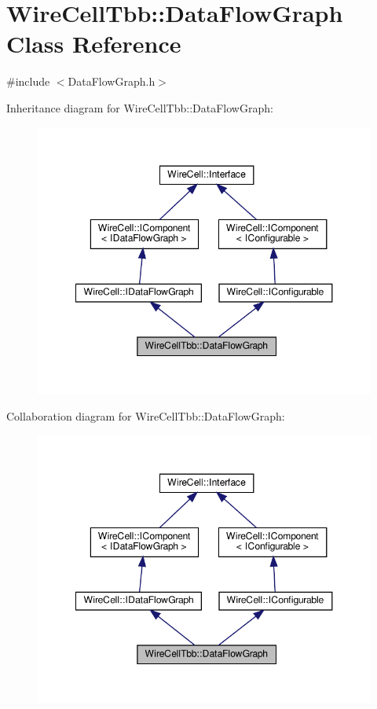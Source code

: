 \hypertarget{class_wire_cell_tbb_1_1_data_flow_graph}{}\section{Wire\+Cell\+Tbb\+:\+:Data\+Flow\+Graph Class Reference}
\label{class_wire_cell_tbb_1_1_data_flow_graph}


{\ttfamily \#include $<$Data\+Flow\+Graph.\+h$>$}



Inheritance diagram for Wire\+Cell\+Tbb\+:\+:Data\+Flow\+Graph\+:
\nopagebreak
\begin{figure}[H]
\begin{center}
\leavevmode
\includegraphics[width=348pt]{class_wire_cell_tbb_1_1_data_flow_graph__inherit__graph}
\end{center}
\end{figure}


Collaboration diagram for Wire\+Cell\+Tbb\+:\+:Data\+Flow\+Graph\+:
\nopagebreak
\begin{figure}[H]
\begin{center}
\leavevmode
\includegraphics[width=348pt]{class_wire_cell_tbb_1_1_data_flow_graph__coll__graph}
\end{center}
\end{figure}
